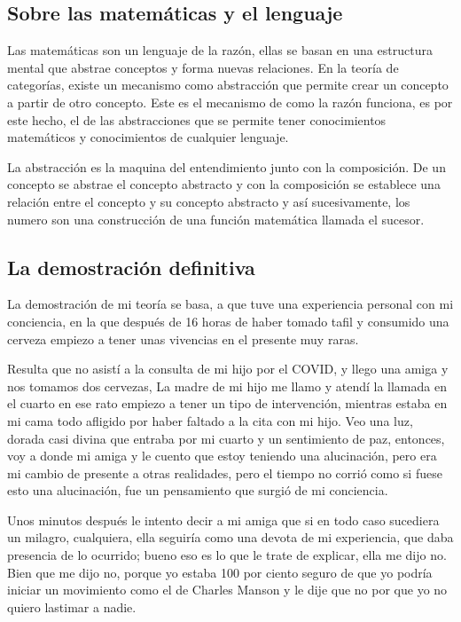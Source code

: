 \documentclass[12pt,letterpaper, a4paper ]{article}
\begin{document}
\subsection{Sobre las matemáticas y el lenguaje}

Las matemáticas son un lenguaje de la razón, ellas se basan en una estructura mental que abstrae conceptos y forma nuevas relaciones. En la teoría de categorías, existe un mecanismo como abstracción que permite crear un concepto a partir de otro concepto. Este es el mecanismo de como la razón funciona, es por este hecho, el de las abstracciones que se permite tener conocimientos matemáticos y conocimientos de cualquier lenguaje.

La abstracción es la maquina del entendimiento junto con la composición. De un concepto se abstrae el concepto abstracto y con la composición se establece una relación entre el concepto y su concepto abstracto y así sucesivamente, los numero son una construcción de una función matemática llamada el sucesor.


\subsection{La demostración definitiva}

La demostración de mi teoría se basa, a que tuve una experiencia personal con mi conciencia, en la que después de 16 horas de haber tomado tafil y consumido una cerveza empiezo a tener unas vivencias en el presente muy raras. 

Resulta que no asistí a la consulta de mi hijo por el COVID, y llego una amiga y nos tomamos dos cervezas, La madre de mi hijo me llamo y atendí la llamada en el cuarto en ese rato empiezo a tener un tipo de intervención, mientras estaba en mi cama todo afligido por haber faltado a la cita con mi hijo. Veo una luz, dorada casi divina que entraba por mi cuarto y un sentimiento de paz, entonces, voy a donde mi amiga y le cuento que estoy teniendo una alucinación, pero era mi cambio de presente a otras realidades, pero el tiempo no corrió como si fuese esto una alucinación, fue un pensamiento que surgió de mi conciencia.

Unos minutos después le intento decir a mi amiga que si en todo caso sucediera un milagro, cualquiera, ella seguiría como una devota de mi experiencia, que daba presencia de lo ocurrido; bueno eso es lo que le trate de  explicar, ella me dijo no. Bien que me dijo no, porque yo estaba 100 por ciento seguro de que yo podría iniciar un movimiento como el de Charles Manson y le dije que no por que yo no quiero lastimar a nadie.
\end{document}

